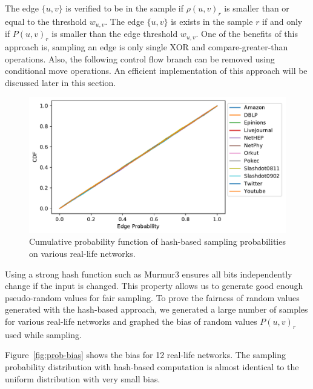 \documentclass[10pt,journal,compsoc]{IEEEtran}
\begin{document}
The edge $\{u,v\}$ is verified to be in the sample if ${\rho}(u,v)_r$ is smaller than or equal to the threshold $w_{u,v}$. 
The edge $\{u,v\}$ is exists in the sample $r$ if and only if  ${P}(u,v)_r$ is smaller than the edge threshold $w_{u,v}$. One of the benefits of this approach is, sampling an edge is only single XOR and compare-greater-than operations. Also, the following control flow branch can be removed using conditional move operations. 
An efficient implementation of this approach will be discussed later in this section.
\begin{figure}[!ht] 
    \centering
    \includegraphics[width=1\linewidth]{./images/cdf.pdf}
    \caption{Cumulative probability function of hash-based sampling probabilities on various real-life networks.}
    \label{fig:prob-cdf} 
\end{figure}
Using a strong hash function such as {{\sc Murmur3}} ensures all bits independently change if the input is changed. This property allows us to generate good enough pseudo-random values for fair sampling. To prove the fairness of random values generated with the hash-based approach, we generated a large number of samples for various real-life networks and graphed the bias of random values $P(u,v)_r$ used while sampling.

Figure~\ref{fig:prob-bias} shows the bias for 12 real-life networks. The sampling probability distribution with hash-based computation is almost identical to the uniform distribution with very small bias.
\end{document}
